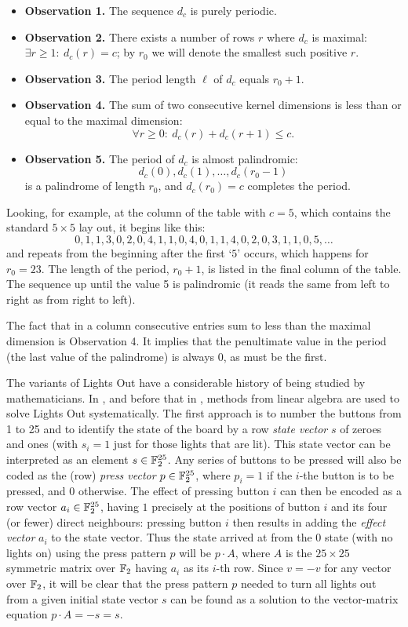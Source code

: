 \begin{itemize}
\item{\bf Observation 1.}
The sequence $d_c$ is purely periodic. %
\item{\bf Observation 2.}
There exists a number of rows $r$ where $d_c$ is maximal:
$\exists r\geq 1:\ d_c(r)=c$; by $r_0$ we will denote the
smallest such positive $r$.
\item{\bf Observation 3.}
The period length $\ell$ of $d_c$ equals $r_0+1$.
\item{\bf Observation 4.}
The sum of two consecutive kernel dimensions 
is less than or equal to the maximal dimension:
$$\forall r\geq0:\ d_c(r)+d_c(r+1)\leq c.$$
\item{\bf Observation 5.}
The period of $d_c$ is almost palindromic:
$$d_c(0), d_c(1), \ldots, d_c(r_0-1)$$
is a palindrome of length $r_0$, and $d_c(r_0)=c$ completes the period.
\end{itemize}
\noindent
Looking, for example, at
the column of the table with $c=5$, which contains
the standard $5\times 5$ lay out, it begins like this:
$$0,1,1,3,0,2,0,4,1,1,0,4,0,1,1,4,0,2,0,3,1,1,0,5,\ldots$$
and repeats from the beginning after the first `$5$' occurs, which
happens for $r_0=23$. The length of the period, $r_0+1$,
is listed in the final column of the table.
The sequence up until the value 5 is palindromic 
(it reads the same from left to right as from right to left).

The fact that in a column consecutive entries sum to less than the
maximal dimension is Observation 4. It implies
that the penultimate value in the period (the last value of the
palindrome) is always 0, as must be the first.

The variants of Lights Out have a considerable history of
being studied by mathematicians. In \cite{anderson98}, and before that in
\cite{pelletier87}, methods from linear algebra are used to solve Lights
Out systematically.
The first approach is to number the buttons from 1 to 25 and to identify
the state of the board by a row {\it state vector} $s$ of zeroes and ones
(with $s_i=1$ just for those lights that are lit). This state vector can be
interpreted as an element $s\in\mathbb F_2^{25}$.
Any series of buttons to be pressed will also be coded as the (row) 
{\it press vector} $p\in\mathbb F_2^{25}$,
where $p_i=1$ if the $i$-the button is to be pressed, and 0 otherwise.
The effect of pressing button $i$ can then be encoded as a row vector
$a_i\in\mathbb F_2^{25}$, having $1$ precisely at the positions of button $i$
and its four (or fewer) direct neighbours: pressing button $i$ then
results in adding the {\it effect vector} $a_i$ to the state vector. Thus the state
arrived at from the 0 state (with no lights on) using the press
pattern $p$ will be $p\cdot A$, where $A$ is the $25\times 25$ 
symmetric matrix over $\mathbb F_2$ having $a_i$ as its $i$-th row.
Since $v=-v$ for any vector over $\mathbb F_2$, it will be clear
that the press pattern $p$ needed to turn all lights out
from a given initial state vector $s$ can be found as a
solution to the vector-matrix equation $p\cdot A=-s=s$.

